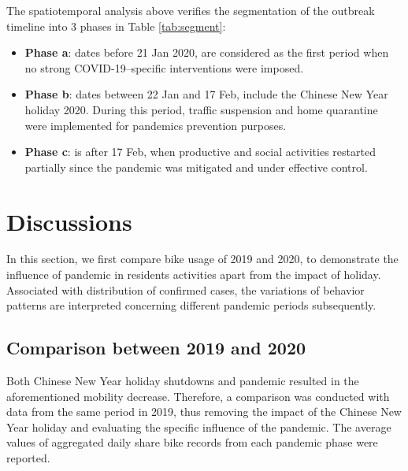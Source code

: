 \documentclass[ijgi,submit,moreauthors,pdftex]{Definitions/mdpi}
\begin{document}
The spatiotemporal analysis above verifies the segmentation of the outbreak timeline into 3 phases in Table \ref{tab:segment}:

\begin{itemize}
	\item \textbf{Phase a}: dates before 21 Jan 2020, are considered as the first period when no strong COVID-19–specific interventions were imposed.
	\item \textbf{Phase b}: dates between 22 Jan and 17 Feb, include the Chinese New Year holiday 2020. During this period, traffic suspension and home quarantine were implemented for pandemics prevention purposes.
	\item \textbf{Phase c}: is after 17 Feb, when productive and social activities restarted partially since the pandemic was mitigated and under effective control.
\end{itemize}


\section{Discussions}\label{sec:discussions}
In this section, we first compare bike usage of 2019 and 2020, to demonstrate the influence of pandemic in residents activities apart from the impact of holiday.
Associated with distribution of confirmed cases, the variations of behavior patterns are interpreted concerning different pandemic periods subsequently.  
\subsection{Comparison between 2019 and 2020}%

Both Chinese New Year holiday shutdowns and pandemic resulted in the aforementioned mobility decrease.
Therefore, a comparison was conducted with data from the same period in 2019, thus removing the impact of the Chinese New Year holiday and evaluating the specific influence of the pandemic.  
The average values of aggregated daily share bike records from each pandemic phase were reported.
\end{document}
